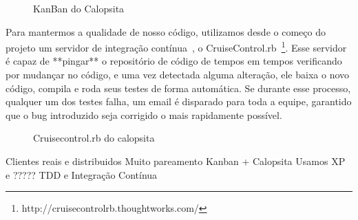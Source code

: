 \begin{figure}[htbp]
  \centering
  \caption{KanBan do Calopsita}
\end{figure}

Para mantermos a qualidade de nosso código, utilizamos desde o começo do projeto um servidor de integração contínua~\cite{ci}, o CruiseControl.rb~\footnote{http://cruisecontrolrb.thoughtworks.com/}. Esse servidor é capaz de **pingar** o repositório de código de tempos em tempos verificando por mudançar no código, e uma vez detectada alguma alteração, ele baixa o novo código, compila e roda seus testes de forma automática. Se durante esse processo, qualquer um dos testes falha, um email é disparado para toda a equipe, garantido que o bug introduzido seja corrigido o mais rapidamente possível.

\begin{figure}[htbp]
  \centering
  \caption{Cruisecontrol.rb do calopsita}
\end{figure}

Clientes reais e distribuidos
Muito pareamento
Kanban + Calopsita
Usamos XP e ?????
TDD e Integração Contínua

